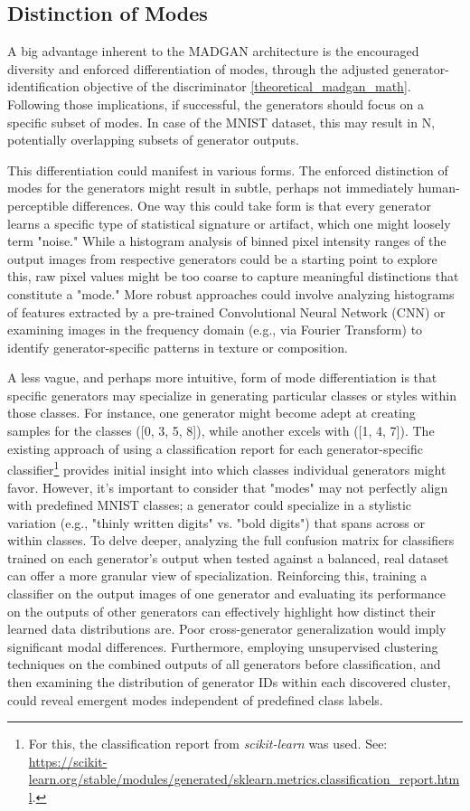 \subsection{Distinction of Modes}
\noindent A big advantage inherent to the MADGAN architecture is the encouraged diversity and enforced differentiation of modes, through the adjusted generator-identification objective of the discriminator \ref{theoretical_madgan_math}. Following those implications, if successful, the generators should focus on a specific subset of modes. In case of the MNIST dataset, this may result in N, potentially overlapping subsets of generator outputs.

This differentiation could manifest in various forms. The enforced distinction of modes for the generators might result in subtle, perhaps not immediately human-perceptible differences. One way this could take form is that every generator learns a specific type of statistical signature or artifact, which one might loosely term "noise." While a histogram analysis of binned pixel intensity ranges of the output images from respective generators could be a starting point to explore this, raw pixel values might be too coarse to capture meaningful distinctions that constitute a "mode." More robust approaches could involve analyzing histograms of features extracted by a pre-trained Convolutional Neural Network (CNN) or examining images in the frequency domain (e.g., via Fourier Transform) to identify generator-specific patterns in texture or composition.

A less vague, and perhaps more intuitive, form of mode differentiation is that specific generators may specialize in generating particular classes or styles within those classes. For instance, one generator might become adept at creating samples for the classes ([0, 3, 5, 8]), while another excels with ([1, 4, 7]). The existing approach of using a classification report for each generator-specific classifier\footnote{For this, the classification report from \textit{scikit-learn} was used. See: \url{https://scikit-learn.org/stable/modules/generated/sklearn.metrics.classification_report.html}.} provides initial insight into which classes individual generators might favor. However, it's important to consider that "modes" may not perfectly align with predefined MNIST classes; a generator could specialize in a stylistic variation (e.g., "thinly written digits" vs. "bold digits") that spans across or within classes. To delve deeper, analyzing the full confusion matrix for classifiers trained on each generator's output when tested against a balanced, real dataset can offer a more granular view of specialization. Reinforcing this, training a classifier on the output images of one generator and evaluating its performance on the outputs of other generators can effectively highlight how distinct their learned data distributions are. Poor cross-generator generalization would imply significant modal differences. Furthermore, employing unsupervised clustering techniques on the combined outputs of all generators before classification, and then examining the distribution of generator IDs within each discovered cluster, could reveal emergent modes independent of predefined class labels.

